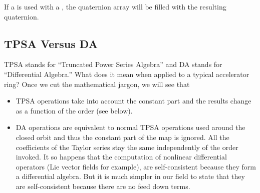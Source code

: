 \documentclass{hitec}     %
\begin{document}
{{{If a   is used with a , the quaternion array will be filled with the resulting quaternion.


\subsection{TPSA Versus DA}
\label{s:tpsa}

TPSA stands for ``Truncated Power Series Algebra'' and DA stands for ``Differential Algebra.''
What does it mean when applied to a typical accelerator ring? Once we cut the mathematical jargon,
we will see that

\begin{itemize}
\item TPSA operations take into account the constant part and the results change as a function of the order (see below). 
%
\item DA operations are equivalent to normal TPSA operations used around the closed orbit and thus the
constant part of the map is ignored. All the coefficients of the Taylor series stay the same
independently of the order invoked. It so happens that the computation of nonlinear differential
operators (Lie vector fields for example), are self-consistent because they form a differential
algebra. But it is much simpler in our field to state that they are self-consistent because there
are no feed down terms.
\end{itemize}

}}}
\end{document}

